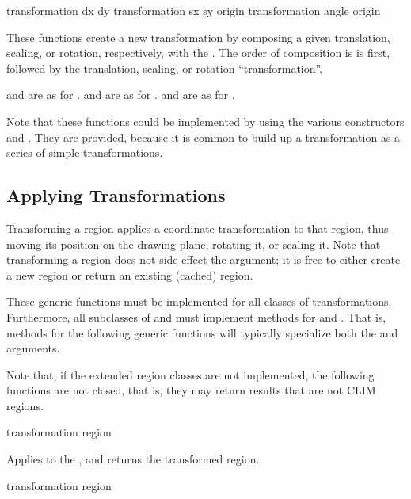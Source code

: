  {transformation dx dy}
     {transformation sx sy \optional origin}
    {transformation angle \optional origin} 

These functions create a new transformation by composing a given translation,
scaling, or rotation, respectively, with the 
.  The order of composition is  is
first, followed by the translation, scaling, or rotation ``transformation''.

 and  are as for .
 and  are as for .
 and  are as for .

Note that these functions could be implemented by using the various constructors
and .  They are provided, because it is common to
build up a transformation as a series of simple transformations.


\subsection {Applying Transformations}

Transforming a region applies a coordinate transformation to that region, thus
moving its position on the drawing plane, rotating it, or scaling it.  Note that
transforming a region does not side-effect the  argument; it is free
to either create a new region or return an existing (cached) region.

These generic functions must be implemented for all classes of transformations.
Furthermore, all subclasses of  and  must implement
methods for  and .  That is, methods
for the following generic functions will typically specialize both the
 and  arguments.

Note that, if the extended region classes are not implemented, the following
functions are not closed, that is, they may return results that are not CLIM
regions.


 {transformation region}

Applies  to the  , and returns the
transformed region.

 {transformation region}

